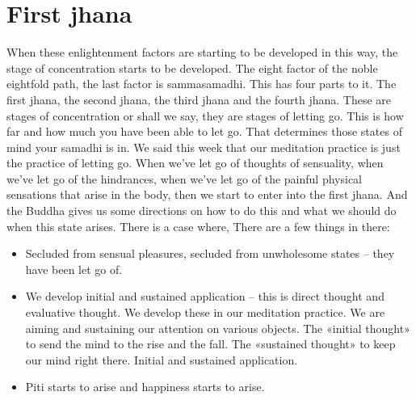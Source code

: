 \documentclass[letterpaper,10pt,english]{sphinxmanual}
\begin{document}
\section{First jhana}
\label{\detokenize{6-a:first-jhana}}
\sphinxAtStartPar
{} When these enlightenment factors are starting to be developed in this
way, the stage of concentration starts to be developed. The eight factor of
the  noble  eightfold  path,  the  last  factor  is  samma\sphinxhyphen{}samadhi.  This
has  four  parts  to  it.  The  first  jhana,  the  second  jhana,  the  third
jhana  and  the  fourth  jhana.  These  are  stages  of  concentration  or  shall  we
say, they are stages of letting go. This is how far and how much you have
been able to let go. That determines those states of mind your samadhi is in.
We said this week that our meditation practice is just the practice of letting
go. When we’ve let go of thoughts of sensuality, when we’ve let go of the
hindrances, when we’ve let go of the painful physical sensations that arise
in the body, then we start to enter into the first jhana. And the Buddha gives
us some directions on how to do this and what we should do when this state
arises. There is a case where,
There are a few things in there:
\begin{itemize}
\item {} 
\sphinxAtStartPar
Secluded from sensual pleasures, secluded from unwholesome states –
they have been let go of.

\item {} 
\sphinxAtStartPar
We develop initial and sustained application – this is direct thought and
evaluative  thought. We  develop  these  in  our  meditation  practice. We
are aiming and sustaining our attention on various objects. The «initial thought» to send the mind to the rise and the fall. The «sustained
thought» to keep our mind right there. Initial and sustained application.

\item {} 
\sphinxAtStartPar
Piti starts to arise and happiness starts to arise.

\end{itemize}
\end{document}
